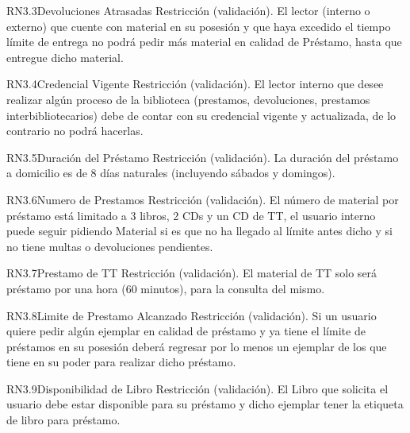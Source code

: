 \begin{BussinesRule}{RN3.3}{Devoluciones Atrasadas} 
	\BRitem[Tipo:] Restricción (validación).
	\BRitem[Descripción:]El lector (interno o externo) que cuente con material en su posesión y que haya excedido el tiempo límite de entrega no podrá pedir más material en calidad de Préstamo, hasta que entregue dicho material.
\end{BussinesRule}

\begin{BussinesRule}{RN3.4}{Credencial Vigente} 
	\BRitem[Tipo:] Restricción (validación).
	\BRitem[Descripción:]El lector interno que desee realizar algún proceso de la biblioteca (prestamos, devoluciones, prestamos interbibliotecarios) debe de contar con su credencial vigente y actualizada, de lo contrario no podrá hacerlas.
\end{BussinesRule}

\begin{BussinesRule}{RN3.5}{Duración del Préstamo} 
	\BRitem[Tipo:] Restricción (validación).
	\BRitem[Descripción:]La duración del préstamo a domicilio es de 8 días naturales (incluyendo sábados y domingos).
\end{BussinesRule}

\begin{BussinesRule}{RN3.6}{Numero de Prestamos} 
	\BRitem[Tipo:] Restricción (validación).
	\BRitem[Descripción:]El número de material por préstamo está limitado a 3 libros, 2 CDs y un CD de TT, el usuario interno puede seguir pidiendo Material si es que no ha llegado al límite antes dicho y si no tiene multas o devoluciones pendientes.
\end{BussinesRule}

\begin{BussinesRule}{RN3.7}{Prestamo de TT} 
	\BRitem[Tipo:] Restricción (validación).
	\BRitem[Descripción:]El material de TT solo será préstamo por una hora (60 minutos), para la consulta del mismo.
\end{BussinesRule}

\begin{BussinesRule}{RN3.8}{Limite de Prestamo Alcanzado} 
	\BRitem[Tipo:] Restricción (validación).
	\BRitem[Descripción:]Si un usuario quiere pedir algún ejemplar en calidad de préstamo y ya tiene el límite de préstamos en su posesión deberá regresar por lo menos un ejemplar de los que tiene en su poder para realizar dicho préstamo.
\end{BussinesRule}

\begin{BussinesRule}{RN3.9}{Disponibilidad de Libro } 
	\BRitem[Tipo:] Restricción (validación).
	\BRitem[Descripción:]El Libro que solicita el usuario debe estar disponible para su préstamo y dicho ejemplar tener la etiqueta de libro para préstamo.
\end{BussinesRule}

